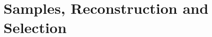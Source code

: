 \chapter[\leavevmode\newline Samples, Reconstruction and Selection]{Samples, Reconstruction and Selection}
\label{chap:Chapter_3}
\lipsum[3]